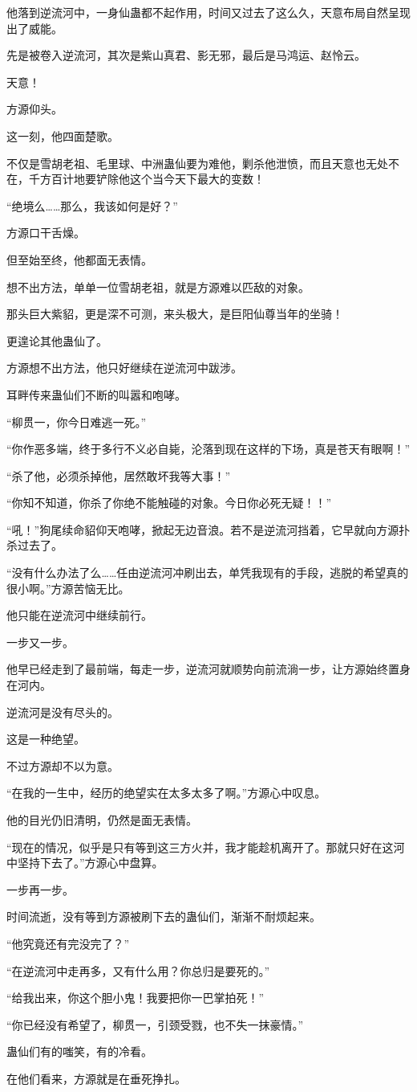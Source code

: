 \begin{this_body}
他落到逆流河中，一身仙蛊都不起作用，时间又过去了这么久，天意布局自然呈现出了威能。

先是被卷入逆流河，其次是紫山真君、影无邪，最后是马鸿运、赵怜云。

天意！

方源仰头。

这一刻，他四面楚歌。

不仅是雪胡老祖、毛里球、中洲蛊仙要为难他，剿杀他泄愤，而且天意也无处不在，千方百计地要铲除他这个当今天下最大的变数！

“绝境么……那么，我该如何是好？”

方源口干舌燥。

但至始至终，他都面无表情。

想不出方法，单单一位雪胡老祖，就是方源难以匹敌的对象。

那头巨大紫貂，更是深不可测，来头极大，是巨阳仙尊当年的坐骑！

更遑论其他蛊仙了。

方源想不出方法，他只好继续在逆流河中跋涉。

耳畔传来蛊仙们不断的叫嚣和咆哮。

“柳贯一，你今日难逃一死。”

“你作恶多端，终于多行不义必自毙，沦落到现在这样的下场，真是苍天有眼啊！”

“杀了他，必须杀掉他，居然敢坏我等大事！”

“你知不知道，你杀了你绝不能触碰的对象。今日你必死无疑！！”

“吼！”狗尾续命貂仰天咆哮，掀起无边音浪。若不是逆流河挡着，它早就向方源扑杀过去了。

“没有什么办法了么……任由逆流河冲刷出去，单凭我现有的手段，逃脱的希望真的很小啊。”方源苦恼无比。

他只能在逆流河中继续前行。

一步又一步。

他早已经走到了最前端，每走一步，逆流河就顺势向前流淌一步，让方源始终置身在河内。

逆流河是没有尽头的。

这是一种绝望。

不过方源却不以为意。

“在我的一生中，经历的绝望实在太多太多了啊。”方源心中叹息。

他的目光仍旧清明，仍然是面无表情。

“现在的情况，似乎是只有等到这三方火并，我才能趁机离开了。那就只好在这河中坚持下去了。”方源心中盘算。

一步再一步。

时间流逝，没有等到方源被刷下去的蛊仙们，渐渐不耐烦起来。

“他究竟还有完没完了？”

“在逆流河中走再多，又有什么用？你总归是要死的。”

“给我出来，你这个胆小鬼！我要把你一巴掌拍死！”

“你已经没有希望了，柳贯一，引颈受戮，也不失一抹豪情。”

蛊仙们有的嗤笑，有的冷看。

在他们看来，方源就是在垂死挣扎。

\end{this_body}


